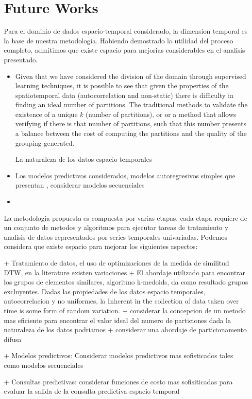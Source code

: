 \section{Future Works}

Para el dominio de dados espacio-temporal considerado, la dimension temporal es la base de nuestra metodologia. Habiendo demostrado la utilidad del proceso completo, admitimos que existe espacio para mejorias considerables en el analisis presentado. 

\begin{itemize}
	\item Given that we have considered the division of the domain through supervised learning techniques, it is possible to see that given the properties of the spatiotemporal data (autocorrelation and non-static) there is difficulty in finding an ideal number of partitions. The traditional methods to validate the existence of a unique $k$ (number of partitions),  or  or a method that allows verifying if there is that number of partitions, such that this number presents a balance between the cost of computing the partitions and the quality of the grouping generated. 
	
	
	La naturaleza de los datos espacio temporales 
	
	\item Los modelos predictivos considerados, modelos autoregresivos simples que presentan , considerar modelos secuenciales 
	
	\item 
\end{itemize}

La metodologia propuesta es compuesta por varias etapas, cada etapa requiere de un conjunto de metodos y algoritmos para ejecutar tareas de tratamiento y analisis de datos representados por series temporales univariadas. Podemos considera que existe espacio para mejorar los siguientes aspectos:

+ Tratamiento de datos, el uso de optimizaciones de la medida de similitud DTW, en la literature existen variaciones 
+ El abordaje utilizado para encontrar los grupos de elementos similares, algoritmo k-medoids, da como resultado grupos excluyentes. Dadas las propiedades de los datos espacio temporales, autocorrelacion y no uniformes, la Inherent in the collection of data taken over time is some form of random variation. 
    + considerar la concepcion de un metodo mas eficiente para encontrar el valor ideal del numero de particiones dada la naturaleza de los datos podriamos 
    + considerar una abordaje de particionamento difusa 

+ Modelos predictivos: Considerar modelos predictivos mas sofisticados tales como modelos secuenciales 

+ Consultas predictivas: considerar funciones de costo mas sofisiticadas para evaluar la salida de la consulta predictiva espacio temporal
